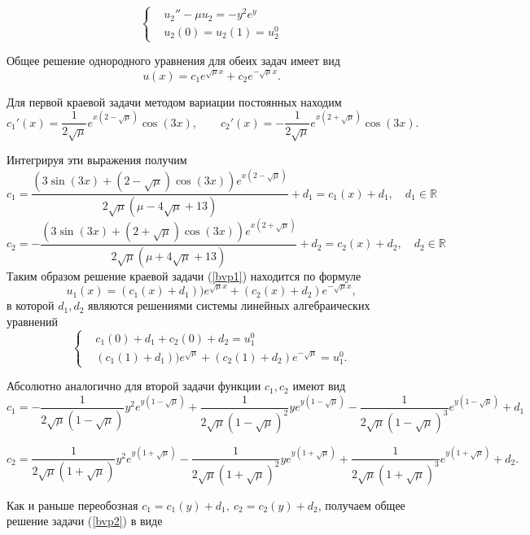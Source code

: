 \documentclass[11pt]{article}
\begin{document}
\begin{equation}
\left\{
	\begin{aligned}
	& u_2''-\mu u_2 = -y^2 e^y \label{bvp2} \\
	& u_2(0) = u_2(1) = u_2^0 
	\end{aligned}	
\right.
\end{equation}

Общее решение однородного уравнения для обеих задач имеет вид
$$u(x) = c_1 e^{\sqrt{\mu}x} + c_2 e^{-\sqrt{\mu}x}.$$

Для первой краевой задачи методом вариации постоянных находим
$$c_1'(x) = \frac{1}{2\sqrt{\mu}}e^{x\left(2-\sqrt{\mu}\right)}\cos(3x), \qquad
c_2'(x) = -\frac{1}{2\sqrt{\mu}}e^{x\left(2+\sqrt{\mu}\right)}\cos(3x).$$

Интегрируя эти выражения получим 
$$c_1 = \frac{\left(3\sin\left(3x\right)+\left(2-\sqrt{\mu}\right)\cos\left(3x\right)\right)e^{x\left(2-\sqrt{\mu}\right)}}{2\sqrt{\mu}
\left(\mu-4\sqrt{\mu}+13\right)} + d_1 = c_1(x) + d_1, \quad d_1 \in \mathbb{R}$$
$$c_2 = -\frac{\left(3\sin\left(3x\right)+\left(2+\sqrt{\mu}\right)\cos\left(3x\right)\right)e^{x\left(2+\sqrt{\mu}\right)}}{2\sqrt{\mu}
\left(\mu+4\sqrt{\mu}+13\right)} + d_2 = c_2(x) + d_2, \quad d_2 \in \mathbb{R}$$
Таким образом решение краевой задачи (\ref{bvp1}) находится по формуле
$$u_1(x) = (c_1(x) + d_1))e^{\sqrt{\mu}x} + (c_2(x) + d_2) e^{-\sqrt{\mu}x},$$
в которой $d_1, d_2$ являются решениями системы линейных алгебраических уравнений
\[
\left\{
	\begin{aligned}
	& c_1(0) + d_1 + c_2(0) + d_2 = u_1^0 \\
	& (c_1(1) + d_1))e^{\sqrt{\mu}} + (c_2(1) + d_2) e^{-\sqrt{\mu}} = u_1^0.
	\end{aligned}	
\right.
\]

Абсолютно аналогично для второй задачи функции $c_1, c_2$ имеют вид
$$c_1 = -\frac{1}{2\sqrt{\mu}\left(1-\sqrt{\mu}\right)}y^2e^{y\left(1-\sqrt{\mu}\right)} 
+\frac{1}{2\sqrt{\mu}\left(1-\sqrt{\mu}\right)^2}ye^{y\left(1-\sqrt{\mu}\right)}
-\frac{1}{2\sqrt{\mu}\left(1-\sqrt{\mu}\right)^3}e^{y\left(1-\sqrt{\mu}\right)}+d_1$$

$$c_2 = \frac{1}{2\sqrt{\mu}\left(1+\sqrt{\mu}\right)}y^2e^{y\left(1+\sqrt{\mu}\right)} 
-\frac{1}{2\sqrt{\mu}\left(1+\sqrt{\mu}\right)^2}ye^{y\left(1+\sqrt{\mu}\right)}
+\frac{1}{2\sqrt{\mu}\left(1+\sqrt{\mu}\right)^3}e^{y\left(1+\sqrt{\mu}\right)}+d_2.$$

Как и раньше переобозная $c_1 = c_1(y) + d_1, \ c_2 = c_2(y) + d_2$, получаем общее решение задачи (\ref{bvp2}) в виде
\end{document}
